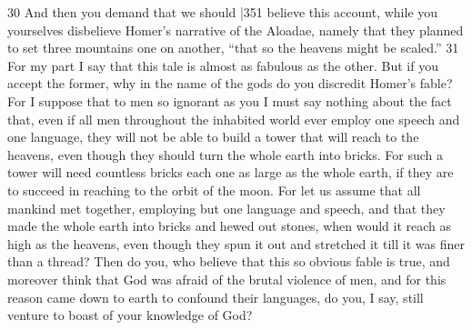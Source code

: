 30 And then you demand that we should |351
believe this account, while you yourselves disbelieve Homer's narrative of the Aloadae, namely that they planned to set three mountains one on another, ``that so the heavens might be scaled.''
31 For my part I say that this tale is almost as fabulous as the other. But if you accept the former, why in the name of the gods do you discredit Homer's fable? For I suppose that to men so ignorant as you I must say nothing about the fact that, even if all men throughout the inhabited world ever employ one speech and one language, they will not be able to build a tower that will reach to the heavens, even though they should turn the whole earth into bricks. For such a tower will need countless bricks each one as large as the whole earth, if they are to succeed in reaching to the orbit of the moon. For let us assume that all mankind met together, employing but one language and speech, and that they made the whole earth into bricks and hewed out stones, when would it reach as high as the heavens, even though they spun it out and stretched it till it was finer than a thread? Then do you, who believe that this so obvious fable is true, and moreover think that God was afraid of the brutal violence of men, and for this reason came down to earth to confound their languages, do you, I say, still venture to boast of your knowledge of God?

